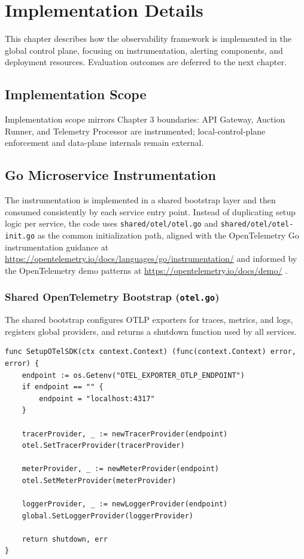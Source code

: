 \section{Implementation Details}

This chapter describes how the observability framework is implemented in the global control plane, focusing on instrumentation, alerting components, and deployment resources. Evaluation outcomes are deferred to the next chapter.

\subsection{Implementation Scope}

Implementation scope mirrors Chapter 3 boundaries: API Gateway, Auction Runner, and Telemetry Processor are instrumented; local-control-plane enforcement and data-plane internals remain external.

\subsection{Go Microservice Instrumentation}

The instrumentation is implemented in a shared bootstrap layer and then consumed consistently by each service entry point. Instead of duplicating setup logic per service, the code uses \texttt{shared/otel/otel.go} and \texttt{shared/otel/otel-init.go} as the common initialization path, aligned with the OpenTelemetry Go instrumentation guidance at \url{https://opentelemetry.io/docs/languages/go/instrumentation/} \cite{opentelemetryGoInstrumentation} and informed by the OpenTelemetry demo patterns at \url{https://opentelemetry.io/docs/demo/} \cite{opentelemetryDemo}.

\subsubsection{Shared OpenTelemetry Bootstrap (\texttt{otel.go})}

The shared bootstrap configures OTLP exporters for traces, metrics, and logs, registers global providers, and returns a shutdown function used by all services.

\begin{verbatim}
func SetupOTelSDK(ctx context.Context) (func(context.Context) error, error) {
    endpoint := os.Getenv("OTEL_EXPORTER_OTLP_ENDPOINT")
    if endpoint == "" {
        endpoint = "localhost:4317"
    }

    tracerProvider, _ := newTracerProvider(endpoint)
    otel.SetTracerProvider(tracerProvider)

    meterProvider, _ := newMeterProvider(endpoint)
    otel.SetMeterProvider(meterProvider)

    loggerProvider, _ := newLoggerProvider(endpoint)
    global.SetLoggerProvider(loggerProvider)

    return shutdown, err
}
\end{verbatim}

